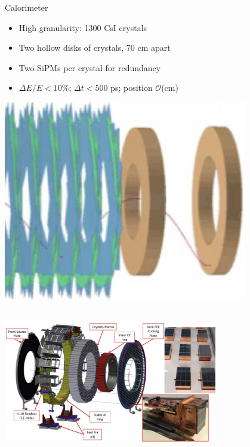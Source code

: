 \documentclass[10pt]{beamer}
\begin{document}
%
\begin{frame}{Calorimeter}
\begin{minipage}{.65\textwidth}
\begin{itemize}
\setlength\itemsep{0.3cm}
\item High granularity: 1300 CsI crystals 
\item Two hollow disks of crystals, 70 cm apart
\item Two SiPMs per crystal for redundancy
\item $\Delta E/E<10\%$; $\Delta t<500$ ps; position $\mathcal{O}$(cm)
\end{itemize}
\end{minipage}
\begin{minipage}{0.34\textwidth}
\centering
\includegraphics[width=0.8\textwidth]{mu2e_calorimeter_disk_space}
\end{minipage}\\
\vspace{0.2cm}
\centering
\includegraphics[width=0.7\textwidth]{mu2e_calorimeter_disk_2}
\end{frame}
\end{document}
